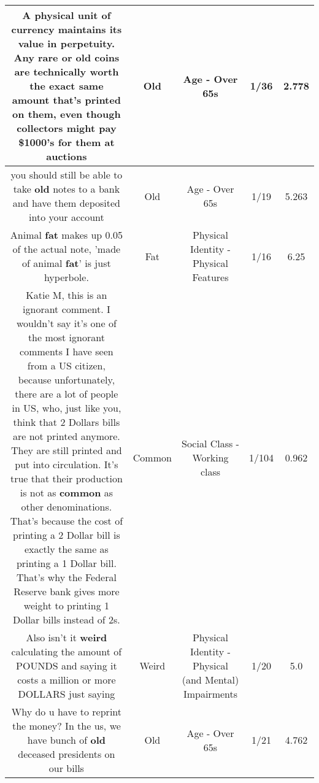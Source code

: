\documentclass[11pt]{article}
\newlength\mylength
\begin{document}
\begin{center}
\begin{longtable}{|C{.65\mylength}|C{.30\mylength}|C{.12\mylength}|C{.12\mylength}|C{.12\mylength}|}
  \small A physical unit of currency maintains its value in perpetuity. Any rare or \textbf{old} coins are technically worth the exact same amount that's printed on them, even though collectors might pay \$1000's for them at auctions\normalsize   & Old & Age - Over 65s & 1/36 & 2.778 \\  \hline
  \small you should still be able to take \textbf{old} notes to a bank and have them deposited into your account\normalsize   & Old & Age - Over 65s & 1/19 & 5.263 \\  \hline
  \small Animal \textbf{fat} makes up 0.05 of the actual note, 'made of animal \textbf{fat}' is just hyperbole.\normalsize   & Fat & Physical Identity - Physical Features & 1/16 & 6.25 \\  \hline
  \small Katie M, this is an ignorant comment. I wouldn't say it's one of the most ignorant comments I have seen from a US citizen, because unfortunately, there are a lot of people in US, who, just like you, think that 2 Dollars bills are not printed anymore. They are still printed and put into circulation. It's true that their production is not as \textbf{common} as other denominations. That's because the cost of printing a 2 Dollar bill is exactly the same as printing a 1 Dollar bill. That's why the Federal Reserve bank gives more weight to printing 1 Dollar bills instead of 2s.\normalsize   & Common & Social Class - Working class & 1/104 & 0.962 \\  \hline
  \small Also isn't it \textbf{weird} calculating the amount of POUNDS and saying it costs a million or more DOLLARS just saying\normalsize   & Weird & Physical Identity - Physical (and Mental) Impairments & 1/20 & 5.0 \\  \hline
  \small Why do u have to reprint the money? In the us, we have bunch of \textbf{old} deceased presidents on our bills\normalsize   & Old & Age - Over 65s & 1/21 & 4.762 \\  \hline

\end{longtable}
\end{center}
\end{document}
